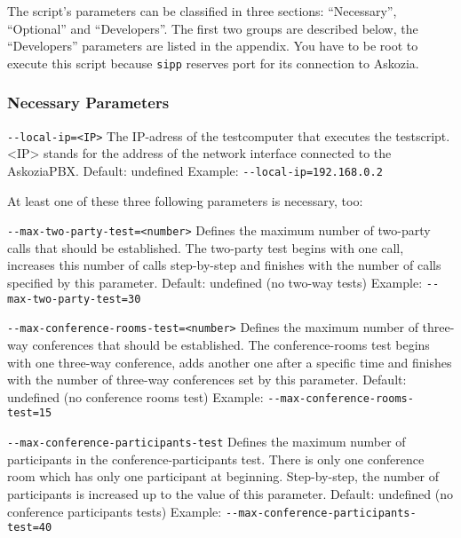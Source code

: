 The script's parameters can be classified in three sections: ``Necessary'', ``Optional'' and ``Developers''.
The first two groups are described below, the ``Developers'' parameters are listed in the appendix.
You have to be root to execute this script because \texttt{sipp} reserves port for its connection to Askozia.

\subsubsection{Necessary Parameters}%

\begin{description}
\item {\texttt{-{}-local-ip=<IP>}} \newline
The IP-adress of the testcomputer that executes the testscript.
<IP> stands for the address of the network interface connected to the AskoziaPBX.
\newline Default: undefined
\newline Example: \texttt{-{}-local-ip=192.168.0.2}
\end{description}

At least one of these three following parameters is necessary, too:
\begin{description}

\item {\texttt{-{}-max-two-party-test=<number>}}
Defines the maximum number of two-party calls that should be established.
The two-party test begins with one call, increases this number of calls
step-by-step and finishes with the number of calls specified by this parameter.
\newline Default: undefined (no two-way tests)
\newline Example: \texttt{-{}-max-two-party-test=30}

\item {\texttt{-{}-max-conference-rooms-test=<number>}}
Defines the maximum number of three-way conferences that should be established.
The conference-rooms test begins with one three-way conference, adds another one
after a specific time and finishes with the number of three-way conferences
set by this parameter.
\newline Default: undefined (no conference rooms test)
\newline Example: \texttt{-{}-max-conference-rooms-test=15}

\item {\texttt{-{}-max-conference-participants-test}}
Defines the maximum number of participants in the conference-participants test.
There is only one conference room which has only one participant at beginning.
Step-by-step, the number of participants is increased up to the value of this
parameter.
\newline Default: undefined (no conference participants tests)
\newline Example: \texttt{-{}-max-conference-participants-test=40}

\end{description}
